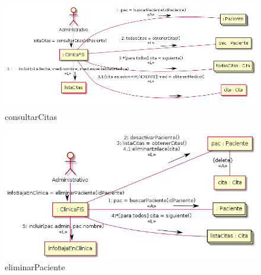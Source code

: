 \documentclass[11pt,a4paper]{article}
\begin{document}
\begin{figure}[H]
	\caption{consultarCitas}
	\centering
	\includegraphics[width=\textwidth,height=\textheight,keepaspectratio]{Diagramas/consultarCitas}
\end{figure}

\begin{figure}[H]
	\caption{eliminarPaciente}
	\centering
	\includegraphics[width=\textwidth,height=\textheight,keepaspectratio]{Diagramas/eliminarPaciente}
\end{figure}
\end{document}
